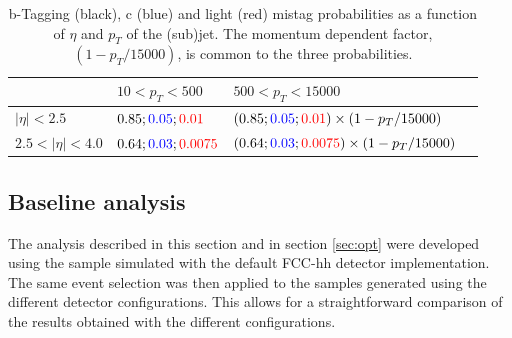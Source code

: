 \begin{table}
	\centering
	\caption{b-Tagging (black), c (blue) and light (red) mistag probabilities as a function of $\eta$ and $p_T$ of the (sub)jet. The momentum dependent factor, $\left(1-p_T/15000\right)$, is common to the three probabilities.}
	\begin{tabular}{llll}
		\toprule 
		\backslashbox{$\eta$}{$p_T$} & $10<p_T<500$ & $500<p_T<15000$ &  \\
		\midrule
		$|\eta|<2.5$ & $0.85;\textcolor{blue}{0.05};\textcolor{red}{0.01} $ & $(0.85;\textcolor{blue}{0.05};\textcolor{red}{0.01})\times\left(1-p_T/15000\right)$ &   \\
		\rowcolor{black!7} $2.5<|\eta|<4.0$ & $0.64;\textcolor{blue}{0.03};\textcolor{red}{0.0075}$ & $(0.64;\textcolor{blue}{0.03};\textcolor{red}{0.0075})\times\left(1-p_T/15000\right)$ &  \\
		\bottomrule
	\end{tabular}
	\label{table:btag}
\end{table}

%
%
%

\subsection{Baseline analysis}

The analysis described in this section and in section \ref{sec:opt} were developed using the sample simulated with the default FCC-hh detector implementation. The same event selection was then applied to the samples generated using the different detector configurations. This allows for a straightforward comparison of the results obtained with the different configurations.

